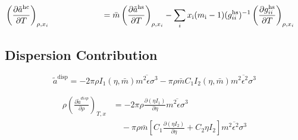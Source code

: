 \documentclass[12pt, letterpaper]{article}
\begin{document}

\begin{equation}
    \begin{aligned}
        \mathmakebox[11.5em][l]{\left(\frac{\partial\tilde{a}^{\mathrm{hc}}}{\partial T}\right)_{\rho,x_{i}}}
        &=
        \bar{m}\left(\frac{\partial\tilde{a}^{\mathrm{hs}}}{\partial T}\right)_{\rho,x_{i}}
        -\sum_{i}x_{\mathrm{i}}(m_{\mathrm{i}}-1)(g_{ii}^{\mathrm{hs}})^{-1}\left(\frac{\partial g_{ii}^{\mathrm{hs}}}{\partial T}\right)_{\rho,x_{i}}
    \end{aligned}
    \label{eq:hc_ares_dT}
\end{equation}


\subsection{Dispersion Contribution}


\begin{equation}
    \tilde{a}^{\mathrm{disp}}=-2 \pi \rho I_{1}(\eta, \bar{m}) \overline{m^2 \epsilon \sigma^3}-\pi \rho \bar{m} C_{1} I_{2}(\eta, \bar{m}) \overline{m^2 \epsilon^2 \sigma^3}
    \label{eq:ares_disp}
\end{equation}



\begin{equation}
    \begin{aligned}
        \rho\left(\frac{\partial\tilde{a}^{disp}}{\partial\rho}\right)_{T,x}
        &=-2\pi\rho\frac{\partial(\eta I_{1})}{\partial\eta}\overline{m^{2}\epsilon\sigma^{3}}
        \\
        &\quad -\pi\rho\bar{m}\left[C_{1}\frac{\partial(\eta I_{2})}{\partial\eta}+C_{2}\eta I_{2}\right]\overline{m^{2}\epsilon^{2}\sigma^{3}}
    \end{aligned}
    \label{eq:disp_ares_dadrho}
\end{equation}
\end{document}
